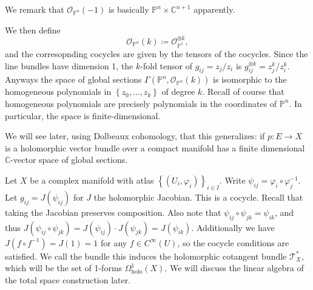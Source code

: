 
We remark that $\mathcal{O} _{\mathbb{P} ^n} (-1)$ is basically $\mathbb{P} ^n\times \mathbb{C} ^{n+1} $ apparently.

We then define
\[
	\mathcal{O} _{\mathbb{P} ^n} (k)\coloneqq \mathcal{O} _{\mathbb{P} ^1} ^{\otimes k} ,
\]
and the corresopnding cocycles are given by the tensors of the cocycles. Since the line bundles have dimension 1, the $k$-fold tensor of $g_{ij} =z_j / z_i$ is $g_{ij} ^{\otimes k} =z_j^k / z_i^k$. Anyways the space of global sections $\Gamma (\mathbb{P} ^n,\mathcal{O} _{\mathbb{P} ^n} (k))$ is isomorphic to the homogeneous polynomials in $\left\{ z_0, \ldots ,z_k \right\} $ of degree $k$. Recall of course that homogeneous polynomials are precisely polynomials in the coordinates of $\mathbb{P} ^n$. In particular, the space is finite-dimensional.

\begin{remark}
	We will see later, using Dolbeaux cohomology, that this generalizes: if $p : E \to X$ is a holomorphic vector bundle over a compact manifold has a finite dimensional $\mathbb{C} $-vector space of global sections.
\end{remark}

\begin{example}
	Let $X$ be a complex manifold with atlas $\left\{ (U_i,\varphi _i) \right\} _{i\in I} $. Write $\psi _{ij} =\varphi _i \circ \varphi _j ^{-1} $. Let $g_{ij} =J(\psi _{ij} )$ for $J$ the holomorphic Jacobian. This is a cocycle. Recall that taking the Jacobian preserves composition. Also note that $\psi _{ij} \circ \psi _{jk} =\psi _{ik} $, and thus $J(\psi _{ij} \circ \psi _{jk} ) = J(\psi _{ij} )\cdot J(\psi _{jk} ) = J(\psi _{ik} )$. Additionally we have $J(f\circ f^{-1} ) = J(1)=1$ for any $f\in C^\infty (U)$, so the cocycle conditions are satisfied. We call the bundle this induces the holomorphic cotangent bundle $\mathcal{T} _X^*$, which will be the set of 1-forms $\Omega _{\mathrm{holo} } ^1(X)$. We will discuss the linear algebra of the total space construction later.
\end{example}

